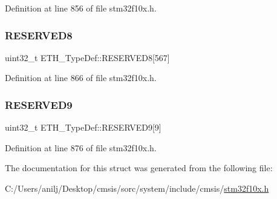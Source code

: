 Definition at line 856 of file stm32f10x.\+h.

\mbox{\label{struct_e_t_h___type_def_a912e8bfafc581d114dc646952209aa1c}} 
\subsubsection{\texorpdfstring{R\+E\+S\+E\+R\+V\+E\+D8}{RESERVED8}}
{\footnotesize\ttfamily uint32\+\_\+t E\+T\+H\+\_\+\+Type\+Def\+::\+R\+E\+S\+E\+R\+V\+E\+D8\mbox{[}567\mbox{]}}



Definition at line 866 of file stm32f10x.\+h.

\mbox{\label{struct_e_t_h___type_def_a57a4c0f1bc5e8dd706e5951c59d29eb8}} 
\subsubsection{\texorpdfstring{R\+E\+S\+E\+R\+V\+E\+D9}{RESERVED9}}
{\footnotesize\ttfamily uint32\+\_\+t E\+T\+H\+\_\+\+Type\+Def\+::\+R\+E\+S\+E\+R\+V\+E\+D9\mbox{[}9\mbox{]}}



Definition at line 876 of file stm32f10x.\+h.



The documentation for this struct was generated from the following file\+:\begin{DoxyCompactItemize}
\item 
C\+:/\+Users/anilj/\+Desktop/cmsis/sorc/system/include/cmsis/\hyperlink{stm32f10x_8h}{stm32f10x.\+h}\end{DoxyCompactItemize}
